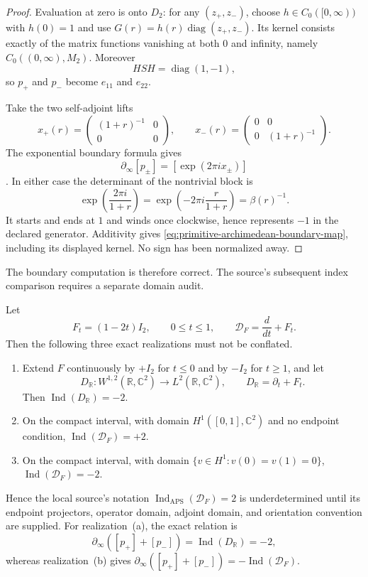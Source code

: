 \begin{proof}
Evaluation at zero is onto $D_2$: for any $(z_+,z_-)$, choose
$h\in C_0([0,\infty))$ with $h(0)=1$ and use
$G(r)=h(r)\operatorname{diag}(z_+,z_-)$.  Its kernel consists exactly of the
matrix functions vanishing at both $0$ and infinity, namely
$C_0((0,\infty),M_2)$.  Moreover
\[
 HSH=\operatorname{diag}(1,-1),
\]
so $p_+$ and $p_-$ become $e_{11}$ and $e_{22}$.

Take the two self-adjoint lifts
\[
 x_+(r)=\begin{pmatrix}(1+r)^{-1}&0\\0&0\end{pmatrix},\qquad
 x_-(r)=\begin{pmatrix}0&0\\0&(1+r)^{-1}\end{pmatrix}.
\]
The exponential boundary formula gives
\[
 \partial_\infty[p_\pm]=[\exp(2\pi ix_\pm)]
\]
\cite[Theorem~9.3.1 and Section~9.3.2]{blackadar1986}.  In either case the
determinant of the nontrivial block is
\[
 \exp\!\left(\frac{2\pi i}{1+r}\right)
 =\exp\!\left(-2\pi i\frac r{1+r}\right)=\beta(r)^{-1}.
\]
It starts and ends at $1$ and winds once clockwise, hence represents $-1$ in
the declared generator.  Additivity gives
\eqref{eq:primitive-archimedean-boundary-map}, including its displayed
kernel.  No sign has been normalized away.
\end{proof}

The boundary computation is therefore correct.  The source's subsequent
index comparison requires a separate domain audit.

\begin{proposition}
\label{prop:primitive-archimedean-domain-audit}
Let
\[
 F_t=(1-2t)I_2,\qquad 0\leq t\leq1,\qquad
 \mathcal D_F=\frac d{dt}+F_t.
\]
Then the following three exact realizations must not be conflated.
\begin{enumerate}[label=(\alph*)]
 \item Extend $F$ continuously by $+I_2$ for $t\leq0$ and by $-I_2$ for
 $t\geq1$, and let
 \[
 D_{\mathbb R}:W^{1,2}(\mathbb R,\mathbb C^2)
 \longrightarrow L^2(\mathbb R,\mathbb C^2),
 \qquad D_{\mathbb R}=\partial_t+F_t.
 \]
 Then $\operatorname{Ind}(D_{\mathbb R})=-2$.
 \item On the compact interval, with domain
 $H^1([0,1],\mathbb C^2)$ and no endpoint condition,
 $\operatorname{Ind}(\mathcal D_F)=+2$.
 \item On the compact interval, with domain
 $\{v\in H^1:v(0)=v(1)=0\}$,
 $\operatorname{Ind}(\mathcal D_F)=-2$.
\end{enumerate}
Hence the local source's notation
$\operatorname{Ind}_{\mathrm{APS}}(\mathcal D_F)=2$ is underdetermined until
its endpoint projectors, operator domain, adjoint domain, and orientation
convention are supplied.  For realization~(a), the exact relation is
\[
 \partial_\infty([p_+]+[p_-])
 =\operatorname{Ind}(D_{\mathbb R})=-2,
\]
whereas realization~(b) gives
$\partial_\infty([p_+]+[p_-])=-\operatorname{Ind}(\mathcal D_F)$.
\end{proposition}

